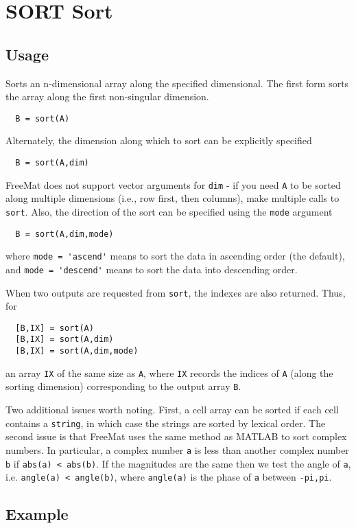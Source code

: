 \section{SORT Sort}

\subsection{Usage}

Sorts an n-dimensional array along the specified dimensional.  The first
form sorts the array along the first non-singular dimension.
\begin{verbatim}
  B = sort(A)
\end{verbatim}
Alternately, the dimension along which to sort can be explicitly specified
\begin{verbatim}
  B = sort(A,dim)
\end{verbatim}
FreeMat does not support vector arguments for \verb|dim| - if you need \verb|A| to be
sorted along multiple dimensions (i.e., row first, then columns), make multiple
calls to \verb|sort|.  Also, the direction of the sort can be specified using the 
\verb|mode| argument
\begin{verbatim}
  B = sort(A,dim,mode)
\end{verbatim}
where \verb|mode = 'ascend'| means to sort the data in ascending order (the default),
and \verb|mode = 'descend'| means to sort the data into descending order.  

When two outputs are requested from \verb|sort|, the indexes are also returned.
Thus, for 
\begin{verbatim}
  [B,IX] = sort(A)
  [B,IX] = sort(A,dim)
  [B,IX] = sort(A,dim,mode)
\end{verbatim}
an array \verb|IX| of the same size as \verb|A|, where \verb|IX| records the indices of \verb|A|
(along the sorting dimension) corresponding to the output array \verb|B|. 

Two additional issues worth noting.  First, a cell array can be sorted if each 
cell contains a \verb|string|, in which case the strings are sorted by lexical order.
The second issue is that FreeMat uses the same method as MATLAB to sort complex
numbers.  In particular, a complex number \verb|a| is less than another complex
number \verb|b| if \verb|abs(a) < abs(b)|.  If the magnitudes are the same then we 
test the angle of \verb|a|, i.e. \verb|angle(a) < angle(b)|, where \verb|angle(a)| is the
phase of \verb|a| between \verb|-pi,pi|.
\subsection{Example}

